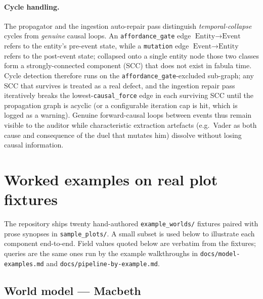 \documentclass[11pt]{article}
\begin{document}
\paragraph{Cycle handling.} The propagator and the ingestion
auto-repair pass distinguish \emph{temporal-collapse} cycles
from \emph{genuine} causal loops. An \texttt{affordance\_gate}
edge $\text{Entity} \rightarrow \text{Event}$ refers to the
entity's pre-event state, while a \texttt{mutation} edge
$\text{Event} \rightarrow \text{Entity}$ refers to the
post-event state; collapsed onto a single entity node those two
classes form a strongly-connected component (SCC) that does not
exist in fabula time. Cycle detection therefore runs on the
\texttt{affordance\_gate}-excluded sub-graph; any SCC that
survives is treated as a real defect, and the ingestion repair
pass iteratively breaks the lowest-\texttt{causal\_force} edge
in each surviving SCC until the propagation graph is acyclic
(or a configurable iteration cap is hit, which is logged as a
warning). Genuine forward-causal loops between events thus
remain visible to the auditor while characteristic
extraction artefacts (e.g.\ Vader as both cause and consequence
of the duel that mutates him) dissolve without losing causal
information.


\section{Worked examples on real plot fixtures}
\label{app:examples}

The repository ships twenty hand-authored \texttt{example\_worlds/}
fixtures paired with prose synopses in \texttt{sample\_plots/}. A
small subset is used below to illustrate each component
end-to-end. Field
values quoted below are verbatim from the fixtures; queries are the
same ones run by the example walkthroughs in
\texttt{docs/model-examples.md} and \texttt{docs/pipeline-by-example.md}.

\subsection{World model --- Macbeth}
\label{app:ex-worldmodel}
\end{document}
